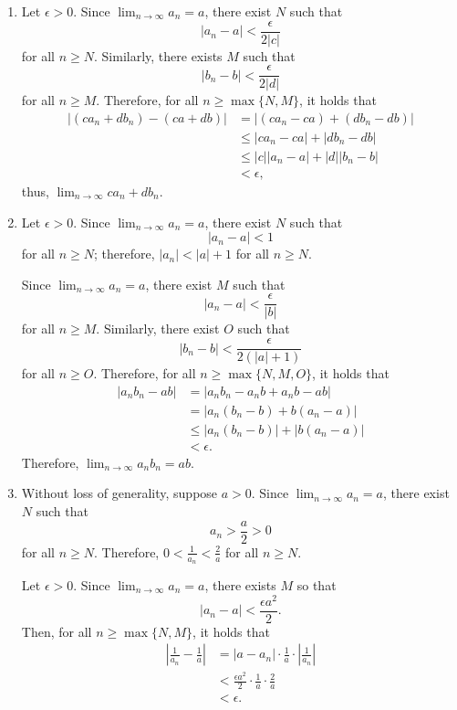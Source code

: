 \begin{dem}{}{}
	\begin{enumerate}
		\item Let \(\epsilon > 0\).
			Since \(\lim_{n\to\infty} a_n = a\), there exist \(N\) such that \[
				\left|a_n - a\right| < \frac{\epsilon}{2|c|}
			\] 
			for all \(n \geq N\).
			Similarly, there exists \(M\) such that \[
				\left| b_n - b \right| < \frac{\epsilon}{2|d|}
			\]
			for all \(n \geq M\).
			Therefore, for all \(n \geq \max\{N, M\}\), it holds that
			\begin{align*}
				\left|(ca_n + db_n) - (ca + db)\right| &= \left|(ca_n - ca) + (db_n - db)\right| \\
													   &\leq |ca_n - ca| + |db_n - db| \\
													   &\leq |c||a_n-a| + |d||b_n-b| \\
													   &< \epsilon,
			\end{align*}
			thus, \(\lim_{n\to\infty} ca_n + db_n\).
		\item Let \(\epsilon > 0\).
			Since \(\lim_{n\to\infty} a_n = a\), there exist \(N\) such that \[
				|a_n - a| < 1
			\] 
			for all \(n \geq N\); therefore, \(|a_n| < |a| + 1\) for all \(n \geq N\).

			Since \(\lim_{n\to\infty} a_n = a\), there exist \(M\) such that \[
				|a_n - a| < \frac{\epsilon}{|b|}
			\] 
			for all \(n \geq M\).
			Similarly, there exist \(O\) such that \[
				|b_n - b| < \frac{\epsilon}{2 (|a| + 1)}
			\] 
			for all \(n \geq O\).
			Therefore, for all  \(n \geq \max\{N, M, O\}\), it holds that
			\begin{align*}
				|a_nb_n - ab| &= |a_nb_n - a_nb + a_nb - ab| \\
							  &= |a_n(b_n - b) + b(a_n - a)| \\
							  &\leq |a_n(b_n - b)| + |b(a_n - a)| \\
							  &< \epsilon.
			\end{align*}
			Therefore, \(\lim_{n\to\infty} a_nb_n = ab\).

		\item Without loss of generality, suppose \(a > 0\).
			Since \(\lim_{n\to\infty} a_n = a\), there exist \(N\) such that \[
					a_n > \frac{a}{2} > 0
				\]
				for all \(n \geq N\).
				Therefore, \(0 < \frac{1}{a_n} < \frac{2}{a}\) for all \(n \geq N\).

			Let \(\epsilon > 0\). Since \(\lim_{n\to\infty} a_n = a\), there exists \(M\) so that \[
				|a_n - a| < \frac{\epsilon a^2}{2}.
			\]
			Then, for all \(n \geq \max\{N, M\}\), it holds that
			\begin{align*}
				\left|\frac{1}{a_n} - \frac{1}{a}\right| &= |a - a_n|\cdot \frac{1}{a} \cdot \left|\frac{1}{a_n}\right|\\
				&< \frac{\epsilon a^2}{2} \cdot \frac{1}{a} \cdot \frac{2}{a} \\
				&< \epsilon.
			\end{align*}


\end{enumerate}
\end{dem}

